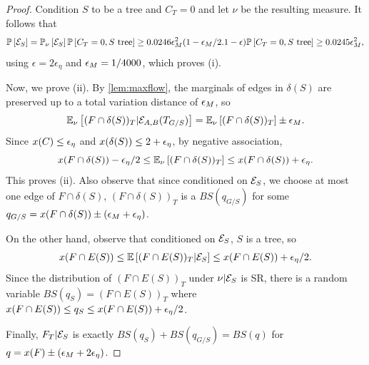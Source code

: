 \begin{proof}
Condition $S$ to be a tree and $C_T=0$ and let $\nu$ be the resulting measure. 
It follows that  
$${\mathbb{P}}\left[{\cal E}_S\right]  = {\mathbb{P}}_{\nu}\left[{\cal E}_S\right] {\mathbb{P}}\left[C_T=0,S\text{ tree}\right]\geq 0.0246 {\epsilon}_M^2(1-{\epsilon}_M/2.1-{\epsilon}){\mathbb{P}}\left[C_T=0,S\text{ tree}\right] \geq 0.0245{\epsilon}_M^2,$$
using $\epsilon = 2\epsilon_\eta$ and ${\epsilon}_M = 1/4000$, which proves (i). 

Now, we prove (ii). By \cref{lem:maxflow}, the marginals of edges in $\delta(S)$ are preserved up to a total variation distance of ${\epsilon}_M$, so
$${\mathbb{E}}_{\nu}\left[(F\cap \delta(S))_T | {\cal E}_{A,B}(T_{G/S})\right] = {\mathbb{E}}_{\nu}\left[(F\cap \delta(S))_T\right]\pm {\epsilon}_M.$$
Since $x(C)\leq {\epsilon}_\eta$ and $x(\delta(S)) \le 2+{\epsilon}_\eta$, by negative association, 
$$x(F\cap \delta(S))-{\epsilon}_\eta/2\leq {\mathbb{E}}_{\nu}\left[(F\cap \delta(S))_T\right] \leq x(F\cap \delta(S)) + {\epsilon}_\eta.$$
This proves (ii).
Also observe that since conditioned on ${\cal E}_S$, we choose at most one edge of $F\cap \delta(S)$, $(F\cap \delta(S))_T$ is a $BS(q_{G/S})$ for some 
 $q_{G/S}=x(F \cap \delta(S))\pm({\epsilon}_M+{\epsilon}_\eta)$.

On the other hand, observe that conditioned on ${\cal E}_S$, $S$ is a tree, so 
$$x(F\cap E(S))\leq {\mathbb{E}}\left[(F\cap E(S))_T | {\cal E}_S\right] \leq x(F\cap E(S))+{\epsilon}_\eta/2.$$
Since the distribution of $(F\cap E(S))_T$ under $\nu | {\cal E}_S$ is SR,  there is a random variable $BS(q_S)=(F\cap E(S))_T$  where $x(F\cap E(S))\leq q_S\leq x(F\cap E(S))+{\epsilon}_\eta/2$.

Finally, $F_T|{\cal E}_S$ is exactly $BS(q_S)+BS(q_{G/S}) = BS(q)$ for $q=x(F)\pm({\epsilon}_M+2{\epsilon}_\eta)$.
\end{proof}



